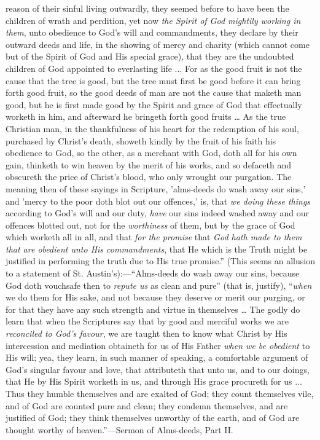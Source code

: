 reason of their sinful living outwardly, they seemed before to have
been the children of wrath and perdition, yet now \emph{the Spirit of God
mightily working in them}, unto obedience to God's will and
commandments, they declare by their outward deeds and life, in the
showing of mercy and charity (which cannot come but of the Spirit of
God and His special grace), that they are the undoubted children of
God appointed to everlasting life ... For as
the good fruit is not the cause that the tree is good, but the tree
must first be good before it can bring forth good fruit, so the good
deeds of man are not the cause that maketh man good, but he is
first made good by the Spirit and grace of God that effectually
worketh in him, and afterward he bringeth forth good fruits … As the
true Christian man, in the thankfulness of his heart for the
redemption of his soul, purchased by Christ's death, showeth kindly
by the fruit of his faith his obedience to God, so the other, as a
merchant with God, doth all for his own gain, thinketh to win heaven
by the merit of his works, and so defaceth and obscureth the price of
Christ's blood, who only wrought our purgation. The meaning then of
these sayings in Scripture, 'alms-deeds do wash away our sins,'
and 'mercy to the poor doth blot out our offences,' is, that \emph{we
doing these things} according to God's will and our duty, \emph{have}
our sins indeed washed away and our offences blotted out, not for the \emph{worthiness}
of them, but by the grace of God which worketh all in all, and that \emph{for
the promise} that \emph{God hath made to them that are obedient unto
His commandments}, that He which is the Truth might be justified in
performing the truth due to His true promise.'' (This seems an
allusion to a statement of St. Austin's):—``Alms-deeds
do wash away our sins, because God doth vouchsafe then to \emph{repute us}
as clean and pure'' (that is, justify), ``\emph{when}
we do them for His sake, and not because they deserve or merit our
purging, or for that they have any such strength and virtue in
themselves … The godly do learn that when the Scriptures say that by
good and merciful works we are \emph{reconciled to God's favour}, we
are taught then to know what Christ by His intercession and mediation
obtaineth for us of His Father \emph{when we be obedient} to His will;
yea, they learn, in such manner of speaking, a comfortable argument of
God's singular favour and love, that attributeth that unto us, and
to our doings, that He by His Spirit worketh in us, and through His
grace procureth for us ... Thus they humble
themselves and are exalted of God; they count themselves vile, and of
God are counted pure and clean; they condemn themselves, and are
justified of God; they think themselves unworthy of the earth, and of
God are thought worthy of heaven.''—Sermon of Alms-deeds, Part
II.

